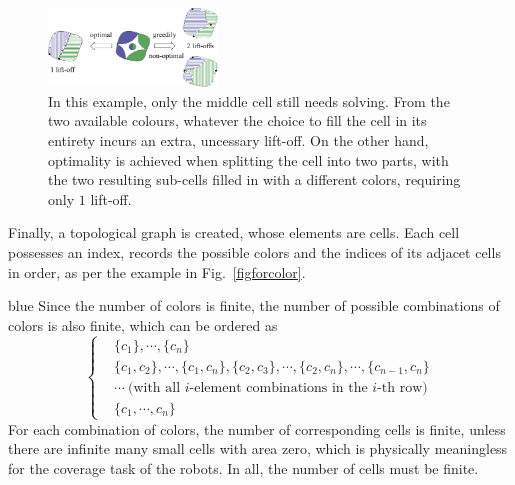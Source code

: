 \documentclass[journal]{IEEEtran}
\begin{document}
\begin{figure}[t]
\centering
\includegraphics[width = 0.4\textwidth]{simple_example/simple_3}
\caption{
In this example, only the middle cell still needs solving. From the two available colours, whatever the choice to fill the cell in its entirety incurs an extra, uncessary lift-off. On the other hand, optimality is achieved when splitting the cell into two parts, 
with the two resulting sub-cells filled in with a different colors, requiring only $1$ lift-off. 
}\label{figsimpleexample}
\end{figure}


Finally, a topological graph is created, whose elements are cells. Each cell possesses an index, records the possible colors 
and the indices of its adjacet cells in order, as per the example in Fig.~\ref{figforcolor}. 
\begin{color}{blue}
Since the number of colors is finite, the number of possible combinations of colors is also finite, which can be ordered as
$$\left\{
\begin{aligned}
&\{c_1\}, \cdots, \{c_n\}\\
&\{c_1, c_2\}, \cdots, \{c_1, c_n\}, \{c_2, c_3\}, \cdots, \{c_2, c_n\}, \cdots, \{c_{n-1}, c_n\}\\
&\cdots\ \mbox{(with all $i$-element combinations in the $i$-th row)}\\
&\{c_1, \cdots, c_n\}
\end{aligned}
\right.$$
For each combination of colors, the number of corresponding cells is finite, unless there are infinite many small cells with area zero, which is physically meaningless for the coverage task of the robots. In all, the number of cells must be finite. 
\end{color}
\end{document}

